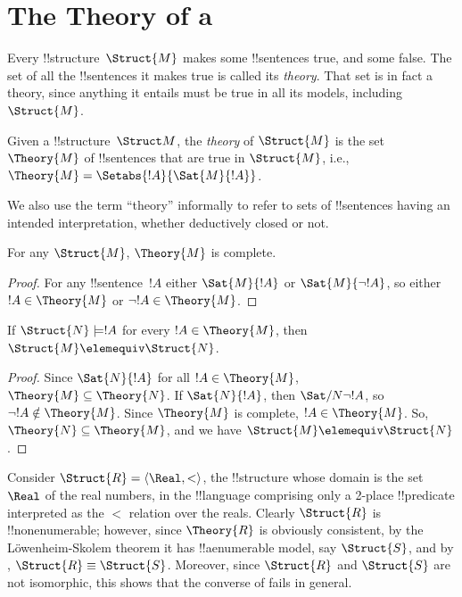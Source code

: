 \documentclass[../../../include/open-logic-section]{subfiles}
\begin{document}

\section{The Theory of a }

Every !!{structure}~$\Struct{M}$ makes some !!{sentence}s true, and
some false. The set of all the !!{sentence}s it makes true is called
its \emph{theory}. That set is in fact a theory, since anything it
entails must be true in all its models, including~$\Struct{M}$.

\begin{defn}
  Given a !!{structure}~$\Struct M$, the \emph{theory} of
  $\Struct{M}$ is the set $\Theory{M}$ of !!{sentence}s
  that are true in $\Struct{M}$, i.e., $\Theory{M} =
  \Setabs{!A}{\Sat{M}{!A}}$.
\end{defn}

We also use the term ``theory'' informally to refer to sets
of !!{sentence}s having an intended interpretation, whether deductively
closed or not.

\begin{prop}
For any $\Struct{M}$, $\Theory{M}$ is complete.
\end{prop}

\begin{proof}
For any !!{sentence}~$!A$ either $\Sat{M}{!A}$ or $\Sat{M}{\lnot !A}$,
so either $!A \in \Theory{M}$ or $\lnot !A \in \Theory{M}$.
\end{proof}

\begin{prop}
  If $\Struct{N} \models !A$ for every $!A \in \Theory{M}$, then
  $\Struct{M} \elemequiv \Struct{N}$.
\end{prop}

\begin{proof}
Since $\Sat{N}{!A}$ for all $!A \in \Theory{M}$, $\Theory{M} \subseteq
\Theory{N}$. If $\Sat{N}{!A}$, then $\Sat/{N}{\lnot !A}$, so $\lnot !A
\notin \Theory{M}$. Since $\Theory{M}$ is complete, $!A \in
\Theory{M}$. So, $\Theory{N} \subseteq \Theory{M}$, and we have
$\Struct{M} \elemequiv \Struct{N}$.
\end{proof}

\begin{rem}
  Consider $\Struct{R} = \langle\Real, <\rangle$, the !!{structure}
  whose domain is the set $\Real$ of the real numbers, in the !!{language}
  comprising only a 2-place !!{predicate} interpreted as the $<$
  relation over the reals. Clearly $\Struct{R}$ is !!{nonenumerable};
  however, since $\Theory{R}$ is obviously consistent, by the
  L\"owenheim-Skolem theorem it has !!a{enumerable} model, say
  $\Struct{S}$, and by , $\Struct{R}
  \equiv \Struct{S}$. Moreover, since $\Struct{R}$ and $\Struct{S}$
  are not isomorphic, this shows that the converse of
   fails in general.
\end{rem}
\end{document}
